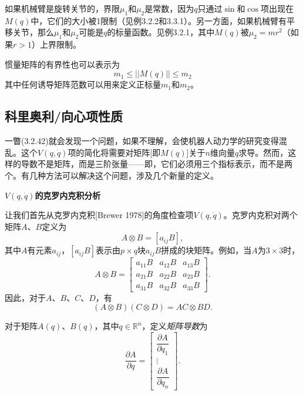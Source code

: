 \documentclass[12pt,a4paper]{ctexart}
\begin{document}
如果机械臂是旋转关节的，界限$\mu_1$和$\mu_2$是常数，因为$q$只通过$\sin$和$\cos$项出现在$M(q)$中，它们的大小被1限制（见例3.2.2和3.3.1）。另一方面，如果机械臂有平移关节，那么$\mu_1$和$\mu_2$可能是$q$的标量函数。见例3.2.1，其中$M(q)$被$\mu_2 = mr^2$（如果$r > 1$）上界限制。

惯量矩阵的有界性也可以表示为
\begin{equation}
m_1 \leq ||M(q)|| \leq m_2
\end{equation}
其中任何诱导矩阵范数可以用来定义正标量$m_1$和$m_2$。

\subsection{科里奥利/向心项性质}

一瞥(3.2.42)就会发现一个问题，如果不理解，会使机器人动力学的研究变得混乱。这个$V(q,\dot{q})$项的简化将需要对矩阵[即$M(q)$]关于$n$维向量$q$求导。然而，这样的导数不是矩阵，而是三阶张量——即，它们必须用三个指标表示，而不是两个。有几种方法可以解决这个问题，涉及几个新量的定义。

\textbf{$V(q,\dot{q})$的克罗内克积分析}

让我们首先从克罗内克积[Brewer 1978]的角度检查项$V(q,\dot{q})$。克罗内克积对两个矩阵$A$、$B$定义为
\begin{equation}
A \otimes B = [a_{ij}B],
\end{equation}
其中$A$有元素$a_{ij}$，$[a_{ij}B]$表示由$p \times q$块$a_{ij}B$拼成的块矩阵。例如，当$A$为$3\times3$时，
\begin{equation*}
A \otimes B = \begin{bmatrix} a_{11}B & a_{12}B & a_{13}B \\ a_{21}B & a_{22}B & a_{23}B \\ a_{31}B & a_{32}B & a_{33}B \end{bmatrix}.
\end{equation*}
因此，对于$A$、$B$、$C$、$D$，有
\begin{equation}
(A \otimes B)(C \otimes D) = AC \otimes BD.
\end{equation}

对于矩阵$A(q)$、$B(q)$，其中$q\in\mathbb{R}^n$，定义\emph{矩阵导数}为
\begin{equation}\label{eq:3.3.10}
\frac{\partial A}{\partial q} = \begin{bmatrix} \dfrac{\partial A}{\partial q_1} \\ \vdots \\ \dfrac{\partial A}{\partial q_n} \end{bmatrix}.
\end{equation}
\end{document}
